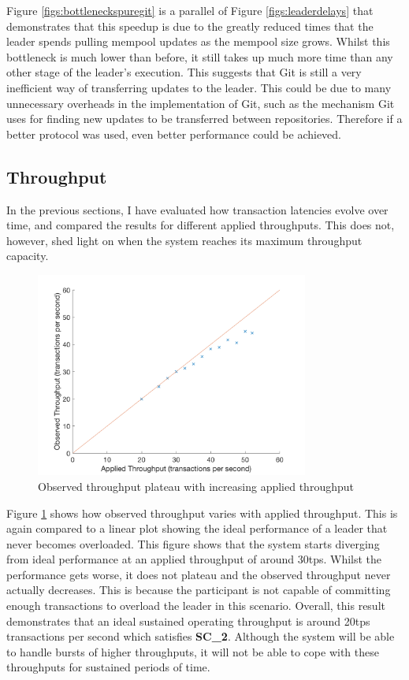 \documentclass[12pt,a4paper,twoside,openright]{report}
\begin{document}
	Figure \ref{figs:bottleneckspuregit} is a parallel of Figure \ref{figs:leaderdelays} that demonstrates that this speedup is due to the greatly reduced times that the leader spends pulling mempool updates as the mempool size grows.
	Whilst this bottleneck is much lower than before, it still takes up much more time than any other stage of the leader's execution.
	This suggests that Git is still a very inefficient way of transferring updates to the leader.  
	This could be due to many unnecessary overheads in the implementation of Git, such as the mechanism Git uses for finding new updates to be transferred between repositories. 
	Therefore if a better protocol was used, even better performance could be achieved.\\

	\subsection{Throughput}
	In the previous sections, I have evaluated how transaction latencies evolve over time, and compared the results for different applied throughputs.
	This does not, however, shed light on when the system reaches its maximum throughput capacity.
	\begin{figure}
		\includegraphics[width=0.8\textwidth] {figs/appliedvsobservedsingle.png}
		\caption{Observed throughput plateau with increasing applied throughput}
		\label{figs:appliedobservedsingle}
	\end{figure}
	Figure \ref{figs:appliedobservedsingle} shows how observed throughput varies with applied throughput. 
	This is again compared to a linear plot showing the ideal performance of a leader that never becomes overloaded.
	This figure shows that the system starts diverging from ideal performance at an applied throughput of around 30tps.
	Whilst the performance gets worse, it does not plateau and the observed throughput never actually decreases.
	This is because the participant is not capable of committing enough transactions to overload the leader in this scenario.
	Overall, this result demonstrates that an ideal sustained operating throughput is around 20tps transactions per second which satisfies \textbf{SC\_2}.
	Although the system will be able to handle bursts of higher throughputs, it will not be able to cope with these throughputs for sustained periods of time.
\end{document}
